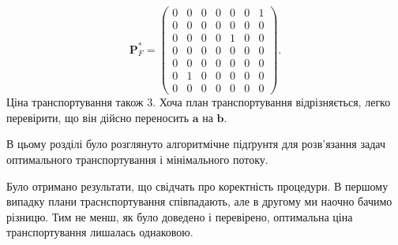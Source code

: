 $$
\mathbf{P}^*_F =
\begin{pmatrix}
    0&  0& 0& 0& 0& 0& 1\\
    0&  0& 0& 0& 0& 0& 0\\
    0&  0& 0& 0& 1& 0& 0\\
    0&  0& 0& 0& 0& 0& 0\\
    0&  0& 0& 0& 0& 0& 0\\
    0&  1& 0& 0& 0& 0& 0\\
    0&  0& 0& 0& 0& 0& 0
\end{pmatrix}.
$$
Ціна транспортування також $3$. Хоча план транспортування відрізняється, легко перевірити, що він дійсно переносить
$\mathbf{a}$ на $\mathbf{b}$.

\chapconclude{\ref{chap:experiment}}
В цьому розділі було розглянуто алгоритмічне підґрунтя для розв'язання задач оптимального транспортування і 
мінімального потоку.

Було отримано результати, що свідчать про коректність процедури. 
В першому випадку плани траснспортування співпадають, але в другому ми наочно бачимо різницю. Тим не менш, як було доведено і
перевірено, оптимальна ціна транспортування лишалась однаковою.
